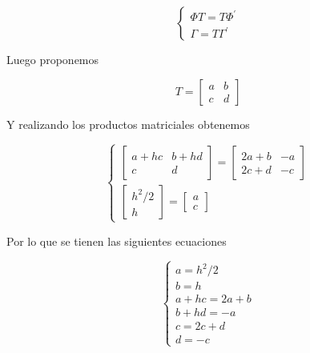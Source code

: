 \documentclass{article}
\newcommand{\syseq}[1]{ \left\{  
                            \begin{array}{c}
                                #1
                            \end{array}
                        \right. }
\begin{document}
        \begin{equation}
            \syseq{ 
                \Phi T = T \Phi^\prime \\
                \Gamma = T \Gamma^\prime
            }
        \end{equation}

        Luego proponemos 

        \begin{equation}
            T = 
                \begin{bmatrix}
                    a & b \\ 
                    c & d
                \end{bmatrix}
        \end{equation}

        Y realizando los productos matriciales obtenemos 

        \begin{equation}
            \syseq{
                \begin{bmatrix}
                    a + hc & b + hd \\
                    c & d
                \end{bmatrix} = 
                \begin{bmatrix}
                    2a+b & -a \\ 
                    2c+d & -c
                \end{bmatrix} \\
                \begin{bmatrix}
                    h^2/2 \\ 
                    h
                \end{bmatrix} = 
                \begin{bmatrix}
                    a \\
                    c
                \end{bmatrix}
            }
        \end{equation}

        Por lo que se tienen las siguientes ecuaciones 

        \begin{equation}
            \syseq{
                a = h^2/2 \\ 
                b = h \\
                a + hc = 2a + b \\
                b+hd = -a \\
                c=2c+d \\
                d = -c
            }
        \end{equation}
\end{document}
